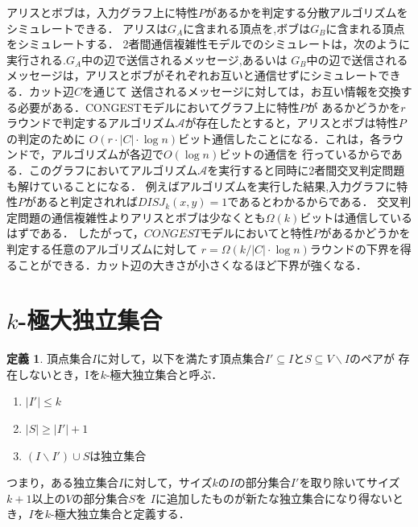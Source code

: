 \documentclass[12pt]{thesis}
\newcommand{\CONGEST}{\textsf{CONGEST}}
\theoremstyle{definition}
\newtheorem{definition}{定義}[chapter]
\begin{document}
アリスとボブは，入力グラフ上に特性$P$があるかを判定する分散アルゴリズムをシミュレートできる．
アリスは$G_{A}$に含まれる頂点を,ボブは$G_{B}$に含まれる頂点をシミュレートする．
2者間通信複雑性モデルでのシミュレートは，次のように実行される.$G_{A}$中の辺で送信されるメッセージ,あるいは
$G_{B}$中の辺で送信されるメッセージは，アリスとボブがそれぞれお互いと通信せずにシミュレートできる．カット辺$C$を通じて
送信されるメッセージに対しては，お互い情報を交換する必要がある．{\CONGEST}モデルにおいてグラフ上に特性$P$が
あるかどうかを$r$ラウンドで判定するアルゴリズム$\mathcal{A}$が存在したとすると，アリスとボブは特性$P$の判定のために
$O(r \cdot |C| \cdot \log n)$ビット通信したことになる．これは，各ラウンドで，アルゴリズムが各辺で$O(\log n)$ビットの通信を
行っているからである．このグラフにおいてアルゴリズム$\mathcal{A}$を実行すると同時に2者間交叉判定問題も解けていることになる．
例えばアルゴリズムを実行した結果,入力グラフに特性$P$があると判定されれば$DISJ_{k} (x, y)=1$であるとわかるからである．
交叉判定問題の通信複雑性よりアリスとボブは少なくとも$\Omega (k)$ビットは通信しているはずである．
したがって，$CONGEST$モデルにおいてと特性$P$があるかどうかを判定する任意のアルゴリズムに対して
$r = \Omega (k / |C| \cdot \log n)$ラウンドの下界を得ることができる．カット辺の大きさが小さくなるほど下界が強くなる．

\section{$k$-極大独立集合}

\begin{definition}
頂点集合$I$に対して，以下を満たす頂点集合$I' \subseteq I$と$S\subseteq V \backslash I$のペアが
存在しないとき，Iを$k$-極大独立集合と呼ぶ．
\begin{enumerate}
\item $|I'| \leq k$
\item $|S| \geq |I'| + 1$
\item $(I \backslash I') \cup S$は独立集合
\end{enumerate}
\end{definition}
つまり，ある独立集合$I$に対して，サイズ$k$の$I$の部分集合$I'$を取り除いてサイズ$k + 1$以上の$V$の部分集合$S$を
$I$に追加したものが新たな独立集合になり得ないとき，$I$を$k$-極大独立集合と定義する．
\end{document}
